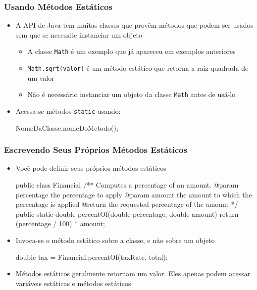 \documentclass[xcolor={dvipsnames,table},aspectratio=169]{beamer}
\begin{document}
\begin{frame}[fragile]\frametitle{Usando Métodos Estáticos}
\begin{itemize}
	\item A API de Java tem muitas classes que provêm métodos que podem ser usados sem que se necessite instanciar um objeto
	\begin{itemize}
		\item A classe \texttt{Math} é um exemplo que já apareceu em exemplos anteriores
		\item \texttt{Math.sqrt(valor)} é um método estático que retorna a raiz quadrada de um valor
		\item Não é necessário instanciar um objeto da classe \texttt{Math} antes de usá-lo
	\end{itemize}
	\item Acessa-se métodos \texttt{static} usando:
\begin{javacode}
NomeDaClasse.nomeDoMetodo();
\end{javacode}
\end{itemize}
\end{frame}

\begin{frame}[fragile]\frametitle{Escrevendo Seus Próprios Métodos Estáticos}
\begin{itemize}
	\item Você pode definir seus próprios métodos estáticos
{\scriptsize
\begin{javacode}
public class Financial {
   /**
      Computes a percentage of an amount.
      @param percentage the percentage to apply
      @param amount the amount to which the percentage is applied
      @return the requested percentage of the amount
   */
   public static double percentOf(double percentage, double amount) {
      return (percentage / 100) * amount;
   }
}
\end{javacode}
}
	\item Invoca-se o método estático sobre a classe, e não sobre um objeto
{\scriptsize
\begin{javacode}
double tax = Financial.percentOf(taxRate, total);
\end{javacode}
}
	\item Métodos estáticos geralmente retornam um valor. Eles apenas podem acessar variáveis estáticas e métodos estáticos
\end{itemize}
\end{frame}
\end{document}
